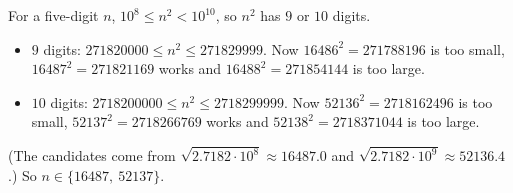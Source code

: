 For a five-digit $n$, $10^8\le n^2<10^{10}$, so $n^2$ has $9$ or $10$ digits.
\begin{itemize}
\item $9$ digits: $271820000\le n^2\le271829999$. Now $16486^2=271788196$ is too small, $16487^2=271821169$ works and $16488^2=271854144$ is too large.
\item $10$ digits: $2718200000\le n^2\le2718299999$. Now $52136^2=2718162496$ is too small, $52137^2=2718266769$ works and $52138^2=2718371044$ is too large.
\end{itemize}
(The candidates come from $\sqrt{2.7182\cdot10^8}\approx16487.0$ and $\sqrt{2.7182\cdot10^9}\approx52136.4$.) So $n\in\boxed{\{16487,\ 52137\}}$.
